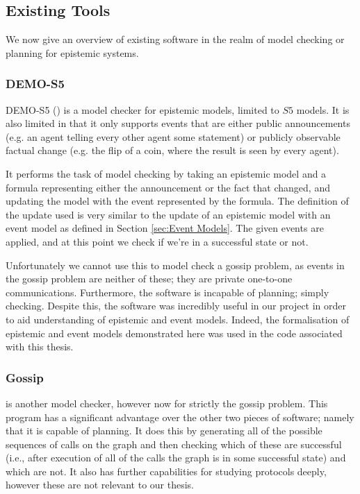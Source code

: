 \documentclass[12pt, a4paper]{article}
\begin{document}
\subsection{Existing Tools}

We now give an overview of existing software in the realm of model checking or
planning for epistemic systems.

\subsubsection{DEMO-S5}

DEMO-S5 (\cite{DEMO-S5}) is a model checker for epistemic models, limited to
$S5$ models. It is also limited in that it only supports events that are either
public announcements (e.g. an agent telling every other agent some statement) or
publicly observable factual change (e.g. the flip of a coin, where the result is
seen by every agent).

It performs the task of model checking by taking an epistemic model and a
formula representing either the announcement or the fact that changed, and
updating the model with the event represented by the formula. The definition of
the update used is very similar to the update of an epistemic model with an
event model as defined in Section \ref{sec:Event Models}. The given events are
applied, and at this point we check if we're in a successful state or not.

\bigskip

Unfortunately we cannot use this to model check a gossip problem, as events in
the gossip problem are neither of these; they are private one-to-one
communications. Furthermore, the software is incapable of planning; simply
checking. Despite this, the software was incredibly useful in our project in
order to aid understanding of epistemic and event models. Indeed, the
formalisation of epistemic and event models demonstrated here was used in the
code associated with this thesis.

\subsubsection{Gossip}

\cite{GithubGossip} is another model checker, however now for strictly the
gossip problem. This program has a significant advantage over the other two
pieces of software; namely that it is capable of planning. It does this by
generating all of the possible sequences of calls on the graph and then checking
which of these are successful (i.e., after execution of all of the calls the
graph is in some successful state) and which are not. It also has further
capabilities for studying protocols deeply, however these are not relevant to
our thesis.
\end{document}
